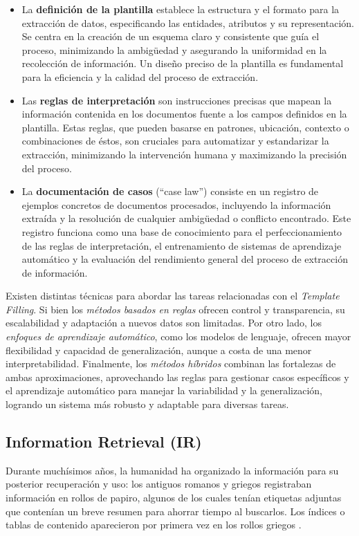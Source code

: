 \begin{itemize}
    \item La \textbf{definición de la plantilla} establece la estructura y el formato 
    para la extracción de datos, especificando las entidades, atributos y su representación. 
    Se centra en la creación de un esquema claro y consistente que guía el proceso, 
    minimizando la ambigüedad y asegurando la uniformidad en la recolección de información. 
    Un diseño preciso de la plantilla es fundamental para la eficiencia y la calidad del proceso de extracción.
    \item Las \textbf{reglas de interpretación} son instrucciones precisas que mapean 
    la información contenida en los documentos fuente a los campos definidos en la plantilla. 
    Estas reglas, que pueden basarse en patrones, ubicación, contexto o combinaciones de éstos, 
    son cruciales para automatizar y estandarizar la extracción, minimizando la intervención humana y 
    maximizando la precisión del proceso.
    \item La \textbf{documentación de casos} (``case law'') consiste en un registro de 
    ejemplos concretos de documentos procesados, incluyendo la información extraída y 
    la resolución de cualquier ambigüedad o conflicto encontrado. Este registro funciona 
    como una base de conocimiento para el perfeccionamiento de las reglas de interpretación, 
    el entrenamiento de sistemas de aprendizaje automático y la evaluación del rendimiento 
    general del proceso de extracción de información.
\end{itemize}

Existen distintas técnicas para abordar las tareas relacionadas con el \textit{Template Filling}. 
Si bien los \textit{métodos basados en reglas} ofrecen control y transparencia, 
su escalabilidad y adaptación a nuevos datos son limitadas. Por otro lado, 
los \textit{enfoques de aprendizaje automático}, como los modelos de lenguaje, 
ofrecen mayor flexibilidad y capacidad de generalización, aunque a costa de una 
menor interpretabilidad. Finalmente, los \textit{métodos híbridos} combinan 
las fortalezas de ambas aproximaciones, aprovechando las reglas para gestionar 
casos específicos y el aprendizaje automático para manejar la variabilidad y 
la generalización, logrando un sistema más robusto y adaptable para diversas tareas.


\subsection{Information Retrieval (IR)}
Durante muchísimos años, la humanidad ha organizado la información para su posterior 
recuperación y uso: los antiguos romanos y griegos registraban información en 
rollos de papiro, algunos de los cuales tenían etiquetas adjuntas que contenían un 
breve resumen para ahorrar tiempo al buscarlos. Los índices o tablas de contenido 
aparecieron por primera vez en los rollos griegos \cite{Wikipedia0}.


